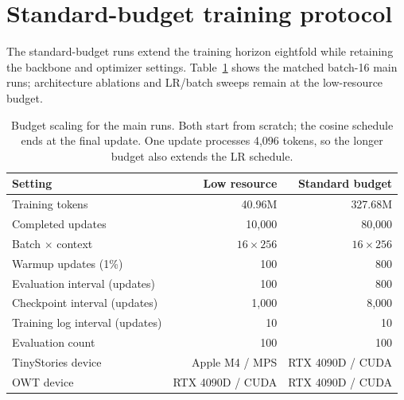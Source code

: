 \clearpage
{}
\section{Standard-budget training protocol}
\label{app:standard_protocol}

The standard-budget runs extend the training horizon eightfold while
retaining the backbone and optimizer settings. Table~\ref{tab:budget_protocol}
shows the matched batch-16 main runs; architecture ablations and LR/batch
sweeps remain at the low-resource budget.

\begin{table}[htbp]
    \centering\small
    \begin{tabular}{@{}lrr@{}}
        \toprule
        Setting & Low resource & Standard budget \\
        \midrule
        Training tokens & 40.96M & 327.68M \\
        Completed updates & 10,000 & 80,000 \\
        Batch $\times$ context & $16\times256$ & $16\times256$ \\
        Warmup updates (1\%) & 100 & 800 \\
        Evaluation interval (updates) & 100 & 800 \\
        Checkpoint interval (updates) & 1,000 & 8,000 \\
        Training log interval (updates) & 10 & 10 \\
        Evaluation count & 100 & 100 \\
        TinyStories device & Apple M4 / MPS & RTX 4090D / CUDA \\
        OWT device & RTX 4090D / CUDA & RTX 4090D / CUDA \\
        \bottomrule
    \end{tabular}
    \caption{Budget scaling for the main runs. Both start from scratch;
    the cosine schedule ends at the final update. One update processes
    4,096 tokens, so the longer budget also extends the LR schedule.}
    \label{tab:budget_protocol}
\end{table}

